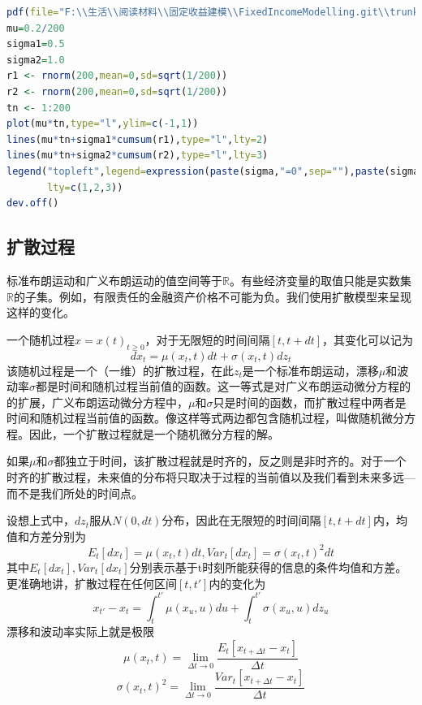 \documentclass[UTF8]{ctexart}
\begin{document}
\begin{lstlisting}[language=R]  
pdf(file="F:\\生活\\阅读材料\\固定收益建模\\FixedIncomeModelling.git\\trunk\\P43.pdf")
mu=0.2/200
sigma1=0.5
sigma2=1.0
r1 <- rnorm(200,mean=0,sd=sqrt(1/200))
r2 <- rnorm(200,mean=0,sd=sqrt(1/200))
tn <- 1:200
plot(mu*tn,type="l",ylim=c(-1,1))
lines(mu*tn+sigma1*cumsum(r1),type="l",lty=2)
lines(mu*tn+sigma2*cumsum(r2),type="l",lty=3)
legend("topleft",legend=expression(paste(sigma,"=0",sep=""),paste(sigma,"=0.5",sep=""),paste(sigma,"=1.0",sep="")),
       lty=c(1,2,3))
dev.off()
\end{lstlisting}

\subsection{扩散过程}

标准布朗运动和广义布朗运动的值空间等于$\mathbb{R}$。有些经济变量的取值只能是实数集$\mathbb{R}$的子集。例如，有限责任的金融资产价格不可能为负。我们使用扩散模型来呈现这样的变化。

一个随机过程$x=x(t)_{t \geqslant 0}$，对于无限短的时间间隔$[t,t+dt]$，其变化可以记为
$$dx_t=\mu(x_t,t)dt+\sigma(x_t,t)dz_t$$
该随机过程是一个（一维）的扩散过程，在此$z_t$是一个标准布朗运动，漂移$\mu$和波动率$\sigma$都是时间和随机过程当前值的函数。这一等式是对广义布朗运动微分方程的的扩展，广义布朗运动微分方程中，$\mu$和$\sigma$只是时间的函数，而扩散过程中两者是时间和随机过程当前值的函数。像这样等式两边都包含随机过程，叫做随机微分方程。因此，一个扩散过程就是一个随机微分方程的解。

如果$\mu$和$\sigma$都独立于时间，该扩散过程就是时齐的，反之则是非时齐的。对于一个时齐的扩散过程，未来值的分布将只取决于过程的当前值以及我们看到未来多远---而不是我们所处的时间点。

设想上式中，$dz_t$服从$N(0,dt)$分布，因此在无限短的时间间隔$[t,t+dt]$内，均值和方差分别为
$$E_t[dx_t]=\mu(x_t,t)dt,Var_t[dx_t]=\sigma(x_t,t)^2dt$$
其中$E_t[dx_t],Var_t[dx_t]$分别表示基于t时刻所能获得的信息的条件均值和方差。更准确地讲，扩散过程在任何区间$[t,t']$内的变化为
$$x_{t'}-x_t=\int_t^{t'}\mu(x_u,u)du+\int_t^{t'}\sigma(x_u,u)dz_u$$
漂移和波动率实际上就是极限
$$\mu(x_t,t)=\lim\limits_{\Delta t \rightarrow 0} \frac{E_t[x_{t+\Delta t}-x_t]}{\Delta t}$$
$$\sigma(x_t,t)^2=\lim\limits_{\Delta t \rightarrow 0} \frac{Var_t[x_{t+\Delta t}-x_t]}{\Delta t}$$
\end{document}
